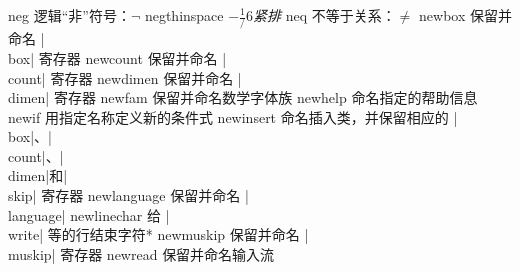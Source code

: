 \capcs neg {逻辑“非”符号：$\neg$}{}{}
\capcs negthinspace {$-\frac1/6$\em 紧排}{}{}
\capcs neq {不等于关系：$\neq$}{}{}
\capcs newbox {保留并命名 |\\box| 寄存器}{}{\@newbox}
\capcs newcount {保留并命名 |\\count| 寄存器}{}{\@newcount}
\capcs newdimen {保留并命名 |\\dimen| 寄存器}{}{\@newdimen}
\capcs newfam {保留并命名数学字体族}{}{\@newfam}
\capcs newhelp {命名指定的帮助信息}{}{\@newhelp}
\capcs newif {用指定名称定义新的条件式}{}{\@newif}
\capcs newinsert {命名插入类，并保留相应的 |\\box|、|\\count|、|\\dimen|和|\\skip| 寄存器}{}{\@newinsert}
\capcs newlanguage {保留并命名 |\\language|}{}{\@newlanguage}
\capcs newlinechar {给 |\\write| 等的行结束字符}*{}
\capcs newmuskip {保留并命名 |\\muskip| 寄存器}{}{\@newmuskip}
\capcs newread {保留并命名输入流}{}{\@newread}
